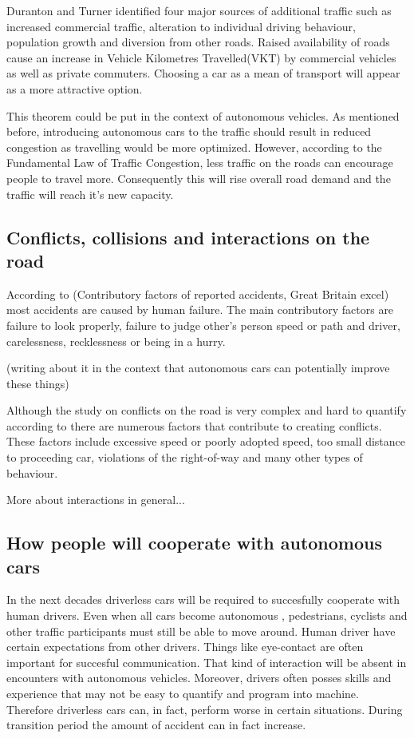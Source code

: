 \documentclass[11pt,english]{article}
\begin{document}
Duranton and Turner identified four major sources of additional traffic such as increased commercial traffic, alteration to individual driving behaviour, population growth and diversion from other roads. Raised availability of roads cause an increase in Vehicle Kilometres Travelled(VKT) by commercial vehicles as well as private commuters. Choosing a car as a mean of transport will appear as a more attractive option. 


This theorem could be put in the context of autonomous vehicles. As mentioned before, introducing autonomous cars to the traffic should result in reduced congestion as travelling would be more optimized. However, according to the Fundamental Law of Traffic Congestion, less traffic on the roads can encourage people to travel more. Consequently this will rise overall road demand and the traffic will reach it's new capacity.


\subsection{Conflicts, collisions and interactions on the road}


\citep{parkin2016understanding}

According to (Contributory factors of reported accidents, Great Britain excel) most accidents are caused by human failure. The main contributory factors are failure to look properly, failure to judge other's person speed or path and driver, carelessness, recklessness or being in a hurry.



(writing about it in the context that autonomous cars can potentially improve these things) 


Although the study on conflicts on the road is very complex and hard to quantify according to \citep{risser1985behavior} there are numerous factors that contribute to creating conflicts. These factors include excessive speed or poorly adopted speed, too small distance to proceeding car, violations of the right-of-way and many other types of behaviour. 


More about interactions in general...


\subsection{How people will cooperate with autonomous cars}
In the next decades driverless cars will be required to succesfully cooperate with human drivers. Even when all cars become autonomous , pedestrians, cyclists and other traffic participants must still be able to move around. 
Human driver have certain expectations from other drivers. Things like eye-contact are often important for succesful communication. That kind of interaction will be absent in encounters with autonomous vehicles. Moreover, drivers often posses skills and experience that may not be easy to quantify and program into machine. Therefore driverless cars can, in fact, perform worse in certain situations\citep{sivak2015road}. During transition period the amount of accident can in fact increase.
\end{document}
